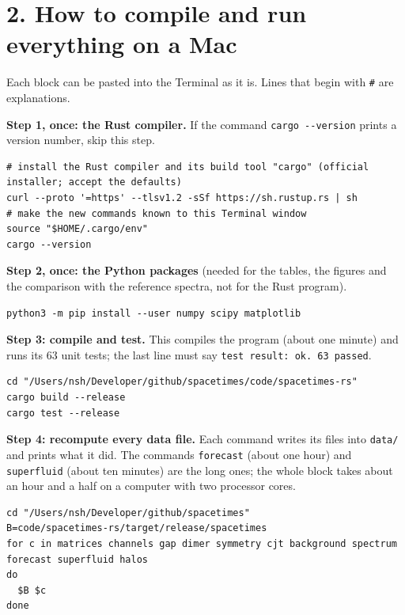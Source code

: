 \documentclass[
  10pt,
]{article}
\begin{document}
\hypertarget{how-to-compile-and-run-everything-on-a-mac}{%
\section{2. How to compile and run everything on a
Mac}\label{how-to-compile-and-run-everything-on-a-mac}}

Each block can be pasted into the Terminal as it is. Lines that begin
with \texttt{\#} are explanations.

\textbf{Step 1, once: the Rust compiler.} If the command
\texttt{cargo\ -\/-version} prints a version number, skip this step.

\begin{verbatim}
# install the Rust compiler and its build tool "cargo" (official installer; accept the defaults)
curl --proto '=https' --tlsv1.2 -sSf https://sh.rustup.rs | sh
# make the new commands known to this Terminal window
source "$HOME/.cargo/env"
cargo --version
\end{verbatim}

\textbf{Step 2, once: the Python packages} (needed for the tables, the
figures and the comparison with the reference spectra, not for the Rust
program).

\begin{verbatim}
python3 -m pip install --user numpy scipy matplotlib
\end{verbatim}

\textbf{Step 3: compile and test.} This compiles the program (about one
minute) and runs its 63 unit tests; the last line must say
\texttt{test\ result:\ ok.\ 63\ passed}.

\begin{verbatim}
cd "/Users/nsh/Developer/github/spacetimes/code/spacetimes-rs"
cargo build --release
cargo test --release
\end{verbatim}

\textbf{Step 4: recompute every data file.} Each command writes its
files into \texttt{data/} and prints what it did. The commands
\texttt{forecast} (about one hour) and \texttt{superfluid} (about ten
minutes) are the long ones; the whole block takes about an hour and a
half on a computer with two processor cores.

\begin{verbatim}
cd "/Users/nsh/Developer/github/spacetimes"
B=code/spacetimes-rs/target/release/spacetimes
for c in matrices channels gap dimer symmetry cjt background spectrum forecast superfluid halos
do
  $B $c
done
\end{verbatim}
\end{document}
